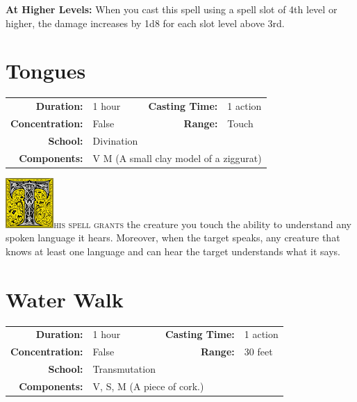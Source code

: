 \documentclass[12pt,showtrims]{memoir}
\begin{document}
\vspace{8pt} \noindent\textbf{At Higher Levels:} When you cast this spell using a spell slot of 4th level or higher, the damage increases by 1d8 for each slot level above 3rd.
\newpage
\section*{Tongues}
{
\small\centering\vspace{-6pt}
\begin{tabular}{rlrl}
\toprule

\textbf{Duration:} & 1 hour &
\textbf{Casting Time:} & 1 action \\
\textbf{Concentration:} & False &
\textbf{Range:} & Touch \\
\textbf{School:} & Divination \\
\textbf{Components:} & \multicolumn{3}{p{0.7\textwidth}}{ V M (A small clay model of a ziggurat)}\\

\bottomrule
\end{tabular}
}

\vspace{1\baselineskip}\noindent
\lettrine[lines=4]{\includegraphics[height=54pt]{initials/T.png}}{his spell grants} the creature you touch the ability to understand any spoken language it hears. Moreover, when the target speaks, any creature that knows at least one language and can hear the target understands what it says.


\newpage
\section*{Water Walk}

{
\small\centering\vspace{-6pt}
\begin{tabular}{rlrl}
\toprule

\textbf{Duration:} & 1 hour &
\textbf{Casting Time:} & 1 action \\
\textbf{Concentration:} & False &
\textbf{Range:} & 30 feet \\
\textbf{School:} & Transmutation \\
\textbf{Components:} & \multicolumn{3}{p{0.7\textwidth}}{V, S, M (A piece of cork.)}\\

\bottomrule
\end{tabular}
}
\end{document}
